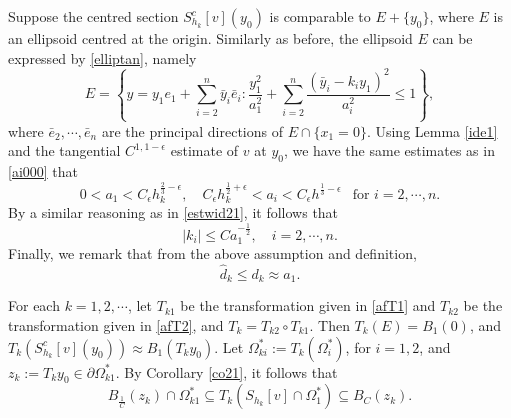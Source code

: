 \documentclass[11pt]{amsart}
\theoremstyle{plain}
\newcommand{\0}{\textbf{0}}
\numberwithin{equation}{section}
\numberwithin{equation}{section}
\numberwithin{figure}{section}
\begin{document}
Suppose the centred section $S_{h_k}^c[v](y_0)$ is comparable to $E+\{y_0\}$, where $E$ is an ellipsoid centred at the origin. 
Similarly as before, the ellipsoid $E$ can be expressed by \eqref{elliptan}, namely
\begin{equation*} 
E = \left\{y = y_1e_1 + \sum_{i=2}^n \bar{y}_i \bar{e}_i : \frac{y_1^2}{a_1^2} + \sum_{i=2}^n \frac{(\bar{y}_i - k_i y_1)^2}{a_i^2} \leq 1\right\},
\end{equation*}
where $\bar e_2, \cdots, \bar e_n$ are the principal directions of  $E\cap\{x_1=0\}.$
Using Lemma \ref{ide1} and the tangential $C^{1,1-\epsilon}$ estimate of $v$ at $y_0$, we have the same estimates as in \eqref{ai000} that
\begin{equation}\label{estwid333}
0 < a_1 < C_\epsilon h_k^{\frac{2}{3}-\epsilon}, \quad C_\epsilon h_k^{\frac{1}{2}+\epsilon} < a_i < C_\epsilon h^{\frac{1}{3}-\epsilon}\ \  \text{ for } i=2, \cdots, n.
\end{equation}
By a similar reasoning as in \eqref{estwid21}, it follows that
\begin{equation}\label{estwid3}
|k_i| \leq C a_1^{-\frac{1}{2}}, \quad i = 2, \cdots, n.
\end{equation}
Finally, we remark that from the above assumption and definition,
\begin{equation}\label{estwid4}
\hat d_k \leq d_k \approx a_1. 
\end{equation}


For each $k=1,2,\cdots$, let $T_{k1}$ be the transformation given in \eqref{afT1} and $T_{k2}$ be the transformation given in \eqref{afT2}, and $T_k = T_{k2} \circ T_{k1}$.
Then \( T_k(E) = B_1(0) \),  and \( T_k\left(S_{h_k}^c[v](y_0)\right) \approx B_1(T_k y_0) \).
Let  \( \Omega^*_{ki} := T_k(\Omega^*_i) \), for \( i = 1,2 \),
and \( z_k := T_k y_0 \in \partial \Omega^*_{k1} \).
By Corollary \ref{co21}, it follows that 
\begin{equation}\label{zklev1}
 B_{\frac{1}{C}}(z_k) \cap \Omega^*_{k1} \subseteq T_k(S_{h_k}[v] \cap \Omega_1^*) \subseteq B_C(z_k).
 \end{equation}  
\end{document}
